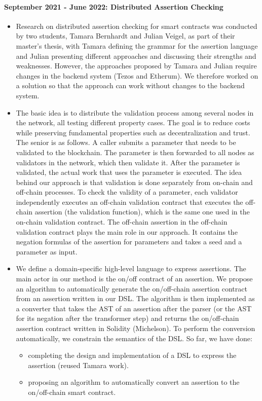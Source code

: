 \documentclass[a4paper,11pt]{article}
\begin{document}
\paragraph{September 2021 - June 2022: Distributed  Assertion Checking}
\begin{itemize}
\item Research on distributed assertion checking for smart contracts was conducted by two students, Tamara Bernhardt and Julian Veigel, as part of their master's thesis, with Tamara defining the grammar for the assertion language and Julian presenting different approaches and discussing their strengths and weaknesses. However, the approaches proposed by Tamara and Julian require changes  in the backend system (Tezos and Etherum). We therefore worked on a solution so that the approach can work without changes to the backend system.
\item 
The basic idea is to distribute the validation process among several nodes in the network, all testing different property cases. The goal is to reduce costs while preserving fundamental properties such as decentralization and trust. The senior is as follows. A caller submits a parameter that needs to be validated to the blockchain. The parameter is then forwarded to all nodes as validators in the network, which then validate it. After the parameter is validated, the actual work that uses the parameter is executed. The idea behind our approach is that validation is done separately from on-chain and off-chain processes. To check the validity of a parameter, each validator independently executes an off-chain validation contract that executes the off-chain assertion (the validation function), which is the same one used in the on-chain validation contract. The off-chain assertion in the off-chain validation contract plays the main role in our approach. It contains the negation formulas of the assertion for parameters and takes a seed and a parameter as input. 

\item We define a domain-specific high-level language to express assertions. The main actor in our method is the on/off contract of an assertion. We propose an algorithm to automatically generate the on/off-chain assertion contract from an assertion written in our DSL. The algorithm is then implemented as a converter that takes the AST of an assertion after the parser (or the AST for its negation after the transformer step) and returns the on/off-chain assertion contract written in Solidity (Michelson). To perform the conversion automatically, we constrain the semantics of the DSL. So far, we have done:
\begin{itemize}
\item completing the design and implementation of a DSL to express the assertion (reused Tamara work).
\item proposing an algorithm to automatically convert an assertion to the on/off-chain smart contract.
\end{itemize}
\end{itemize}  
\end{document}
